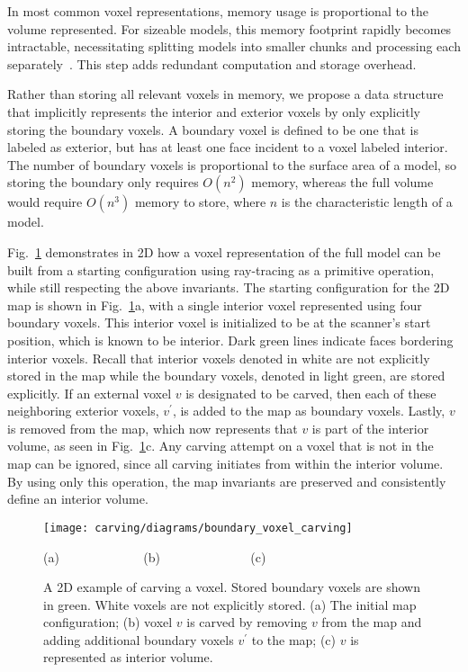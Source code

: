 \documentclass[journal]{IEEEtran}
\begin{document}
In most common voxel representations, memory usage is proportional to the volume represented.  For sizeable models, this memory footprint rapidly becomes intractable, necessitating splitting models into smaller chunks and processing each separately~\cite{Carving,Kintinuous}.  This step adds redundant computation and storage overhead.

Rather than storing all relevant voxels in memory, we propose a data structure that implicitly represents the interior and exterior voxels by only explicitly storing the boundary voxels.  A boundary voxel is defined to be one that is labeled as exterior, but has at least one face incident to a voxel labeled interior.  The number of boundary voxels is proportional to the surface area of a model, so storing the boundary only requires $O(n^2)$ memory, whereas the full volume would require $O(n^3)$ memory to store, where $n$ is the characteristic length of a model.

Fig.~\ref{fig:boundary_carving} demonstrates in 2D how a voxel representation of the full model can be built from a starting configuration using ray-tracing as a primitive operation, while still respecting the above invariants.  The starting configuration for the 2D map is shown in Fig.~\ref{fig:boundary_carving}a, with a single interior voxel represented using four boundary voxels.  This interior voxel is initialized to be at the scanner's start position, which is known to be interior.  Dark green lines indicate faces bordering interior voxels.  Recall that interior voxels denoted in white are not explicitly stored in the map while the boundary voxels, denoted in light green, are stored explicitly.  If an external voxel $v$ is designated to be carved, then each of these neighboring exterior voxels, $v^{\prime}$, is added to the map as boundary voxels.  Lastly, $v$ is removed from the map, which now represents that $v$ is part of the interior volume, as seen in Fig.~\ref{fig:boundary_carving}c.  Any carving attempt on a voxel that is not in the map can be ignored, since all carving initiates from within the interior volume.  By using only this operation, the map invariants are preserved and consistently define an interior volume.

\begin{figure}[t]

  \centerline{\texttt{[image: carving/diagrams/boundary\_voxel\_carving]}}
  \centerline{(a)\,\,\,\,\,\,\,\,\,\,\,\,\,\,\,\,\,\,\,\,\,\,\,\,\,\,\,\,\,\,\,\,\,\,\,\,\,\,\,\,(b)\,\,\,\,\,\,\,\,\,\,\,\,\,\,\,\,\,\,\,\,\,\,\,\,\,\,\,\,\,\,\,\,\,\,\,\,\,\,\,\,\,\,\,(c)\,\,\,\,\,}
\caption{A 2D example of carving a voxel.  Stored boundary voxels are shown in green.  White voxels are not explicitly stored. (a) The initial map configuration; (b) voxel $v$ is carved by removing $v$ from the map and adding additional boundary voxels $v^{\prime}$ to the map; (c) $v$ is represented as interior volume.}
\label{fig:boundary_carving}
\end{figure}
\end{document}
